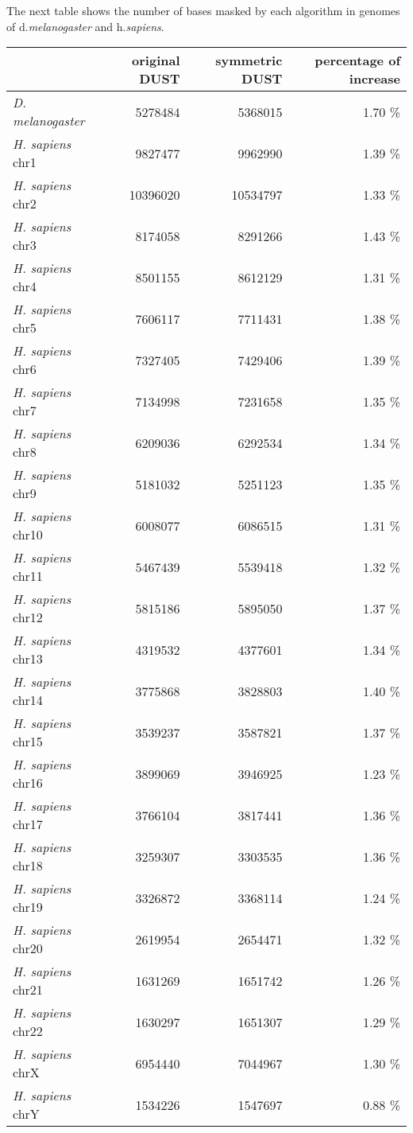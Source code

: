 \documentclass{article}
\begin{document}
\vskip 1cm
The next table shows the number of bases masked by each algorithm
in genomes of d.{\it melanogaster} and h.{\it sapiens}.

\begin{tabular}{|l|r|r|r|}
\hline
 & original DUST & symmetric DUST & percentage of increase \\
\hline
{\it D. melanogaster} & 5278484 & 5368015 & 1.70 \% \\
\hline
{\it H. sapiens} chr1  & 9827477  & 9962990  & 1.39 \% \\
{\it H. sapiens} chr2  & 10396020 & 10534797 & 1.33 \% \\
{\it H. sapiens} chr3  & 8174058  & 8291266  & 1.43 \% \\
{\it H. sapiens} chr4  & 8501155  & 8612129  & 1.31 \% \\
{\it H. sapiens} chr5  & 7606117  & 7711431  & 1.38 \% \\
{\it H. sapiens} chr6  & 7327405  & 7429406  & 1.39 \% \\
{\it H. sapiens} chr7  & 7134998  & 7231658  & 1.35 \% \\
{\it H. sapiens} chr8  & 6209036  & 6292534  & 1.34 \% \\
{\it H. sapiens} chr9  & 5181032  & 5251123  & 1.35 \% \\
{\it H. sapiens} chr10 & 6008077  & 6086515  & 1.31 \% \\
{\it H. sapiens} chr11 & 5467439  & 5539418  & 1.32 \% \\
{\it H. sapiens} chr12 & 5815186  & 5895050  & 1.37 \% \\
{\it H. sapiens} chr13 & 4319532  & 4377601  & 1.34 \% \\
{\it H. sapiens} chr14 & 3775868  & 3828803  & 1.40 \% \\
{\it H. sapiens} chr15 & 3539237  & 3587821  & 1.37 \% \\
{\it H. sapiens} chr16 & 3899069  & 3946925  & 1.23 \% \\
{\it H. sapiens} chr17 & 3766104  & 3817441  & 1.36 \% \\
{\it H. sapiens} chr18 & 3259307  & 3303535  & 1.36 \% \\
{\it H. sapiens} chr19 & 3326872  & 3368114  & 1.24 \% \\
{\it H. sapiens} chr20 & 2619954  & 2654471  & 1.32 \% \\
{\it H. sapiens} chr21 & 1631269  & 1651742  & 1.26 \% \\
{\it H. sapiens} chr22 & 1630297  & 1651307  & 1.29 \% \\
{\it H. sapiens} chrX  & 6954440  & 7044967  & 1.30 \% \\
{\it H. sapiens} chrY  & 1534226  & 1547697  & 0.88 \% \\
\hline
\end{tabular}
\end{document}

